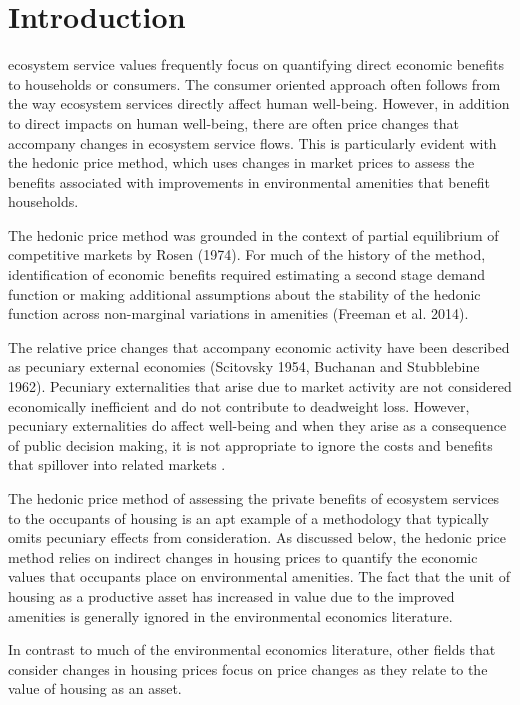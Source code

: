 \documentclass[ecta,nameyear,draft]{econsocart}
\theoremstyle{plain}
\theoremstyle{remark}
\begin{document}
\section{Introduction}

 ecosystem service values frequently focus on quantifying direct economic benefits to households or consumers. The consumer oriented approach often follows from the way ecosystem services directly affect human well-being. However, in addition to direct impacts on human well-being, there are often price changes that accompany changes in ecosystem service flows. This is particularly evident with the hedonic price method, which uses changes in market prices to assess the benefits associated with improvements in environmental amenities that benefit households. 

The hedonic price method was grounded in the context of partial equilibrium of competitive markets by Rosen (1974). For much of the history of the method, identification of economic benefits required estimating a second stage demand function or making additional assumptions about the stability of the hedonic function across non-marginal variations in amenities (Freeman et al. 2014). 

The relative price changes that accompany economic activity have been described as pecuniary external economies (Scitovsky 1954, Buchanan and Stubblebine 1962). Pecuniary externalities that arise due to market activity are not considered economically inefficient and do not contribute to deadweight loss. However, pecuniary externalities do affect well-being and when they arise as a consequence of public decision making, it is not appropriate to ignore the costs and benefits that spillover into related markets . 

The hedonic price method of assessing the private benefits of ecosystem services to the occupants of housing is an apt example of a methodology that typically omits pecuniary effects from consideration. As discussed below, the hedonic price method relies on indirect changes in housing prices to quantify the economic values that occupants place on environmental amenities. The fact that the unit of housing as a productive asset has increased in value due to the improved amenities is generally ignored in the environmental economics literature. 

In contrast to much of the environmental economics literature, other fields that consider changes in housing prices focus on price changes as they relate to the value of housing as an asset.  
\end{document}
